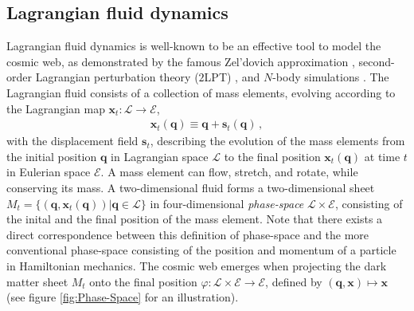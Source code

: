 \documentclass[a4paper, 11pt]{article}
\begin{document}
\subsection{Lagrangian fluid dynamics}
Lagrangian fluid dynamics is well-known to be an effective tool to model the cosmic web, as demonstrated by the famous Zel'dovich approximation \cite{Zeldovich:1970}, second-order Lagrangian perturbation theory ($2$LPT) \cite{Buchert:1992, Buchert:1993a, Buchert:1993b, Buchert:1994a, Buchert:1994b, Bouchet:1995}, and $N$-body simulations \cite{Springel:2005, illustris:2014, eagle:2015, ABACUSSUMMIT:2021, Quijote:2020}. The Lagrangian fluid consists of a collection of mass elements, evolving according to the Lagrangian map $\bm{x}_t:\mathcal{L}\to \mathcal{E}$,
\begin{align}
\bm{x}_t(\bm{q}) \equiv \bm{q} + \bm{s}_t(\bm{q})\,,
\end{align}
with the displacement field $\bm{s}_t$, describing the evolution of the mass elements from the initial position $\bm{q}$ in Lagrangian space $\mathcal{L}$ to the final position $\bm{x}_t(\bm{q})$ at time $t$ in Eulerian space $\mathcal{E}$. A mass element can flow, stretch, and rotate, while conserving its mass. A two-dimensional fluid forms a two-dimensional sheet $M_t=\{(\bm{q},\bm{x}_t(\bm{q})) | \bm{q}\in \mathcal{L}\}$ in four-dimensional \textit{phase-space} $\mathcal{L}\times \mathcal{E}$, consisting of the inital and the final position of the mass element. Note that there exists a direct correspondence between this definition of phase-space and the more conventional phase-space consisting of the position and momentum of a particle in Hamiltonian mechanics. The cosmic web emerges when projecting the dark matter sheet $M_t$ onto the final position $\varphi:\mathcal{L}\times \mathcal{E} \to \mathcal{E}$, defined by $(\bm{q},\bm{x}) \mapsto\bm{x}$ (see figure \ref{fig:Phase-Space} for an illustration).
\end{document}
